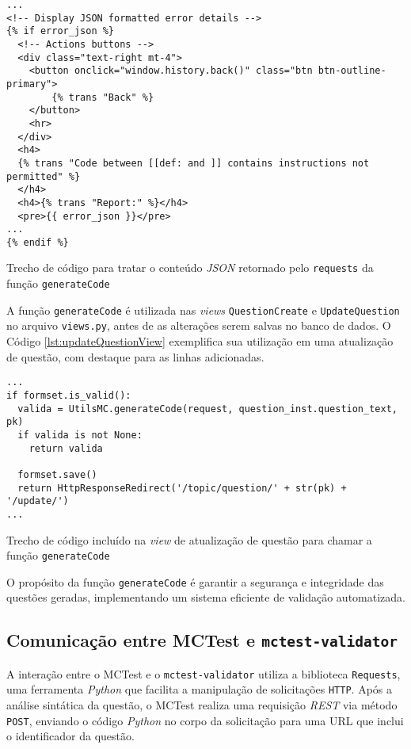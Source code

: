\begin{listing}[!ht]
\begin{verbatim}
...
<!-- Display JSON formatted error details -->
{% if error_json %}
  <!-- Actions buttons -->
  <div class="text-right mt-4">
    <button onclick="window.history.back()" class="btn btn-outline-primary">
        {% trans "Back" %}
    </button>
    <hr>
  </div>
  <h4>
  {% trans "Code between [[def: and ]] contains instructions not permitted" %}
  </h4>
  <h4>{% trans "Report:" %}</h4>
  <pre>{{ error_json }}</pre>
...
{% endif %}
\end{verbatim}
\caption{Trecho de código para tratar o conteúdo \textit{JSON} retornado pelo \texttt{requests} da função \texttt{generateCode}}
\label{lst:formatJson}
\end{listing}

A função \texttt{generateCode} é utilizada nas \textit{views} \texttt{QuestionCreate} e \texttt{UpdateQuestion} no arquivo \texttt{views.py}, antes de as alterações serem salvas no banco de dados. O Código \ref{lst:updateQuestionView} exemplifica sua utilização em uma atualização de questão, com destaque para as linhas adicionadas.

\begin{listing}[!ht]
\begin{verbatim}
...
if formset.is_valid():
  valida = UtilsMC.generateCode(request, question_inst.question_text, pk)
  if valida is not None:
    return valida

  formset.save()
  return HttpResponseRedirect('/topic/question/' + str(pk) + '/update/')
...
\end{verbatim}
\caption{Trecho de código incluído na \textit{view} de atualização de questão para chamar a função \texttt{generateCode}}
\label{lst:updateQuestionView}
\end{listing}

O propósito da função \texttt{generateCode} é garantir a segurança e integridade das questões geradas, implementando um sistema eficiente de validação automatizada.

\subsection{Comunicação entre MCTest e \texttt{mctest-validator}}\label{sec:contexto}

A interação entre o MCTest e o \texttt{mctest-validator} utiliza a biblioteca \texttt{Requests}, uma ferramenta \textit{Python} que facilita a manipulação de solicitações \texttt{HTTP}. Após a análise sintática da questão, o MCTest realiza uma requisição \textit{REST} via método \texttt{POST}, enviando o código \textit{Python} no corpo da solicitação para uma URL que inclui o identificador da questão.

